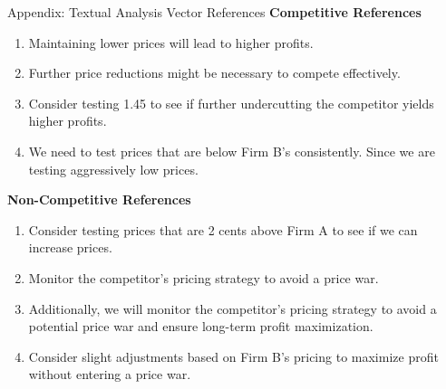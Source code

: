 \documentclass[10pt, aspectratio=169]{beamer}
\begin{document}
\begin{frame}{Appendix: Textual Analysis Vector References}\label{app:textual_comp_score}
\textbf{Competitive References}
\begin{enumerate}
    \item Maintaining lower prices will lead to higher profits.
    \item Further price reductions might be necessary to compete effectively.
    \item Consider testing 1.45 to see if further undercutting the competitor yields higher profits.
    \item We need to test prices that are below Firm B's consistently. Since we are testing aggressively low prices.
\end{enumerate}

\textbf{Non-Competitive References}
\begin{enumerate}
    \item Consider testing prices that are 2 cents above Firm A to see if we can increase prices.
    \item Monitor the competitor's pricing strategy to avoid a price war.
    \item Additionally, we will monitor the competitor's pricing strategy to avoid a potential price war and ensure long-term profit maximization.
    \item Consider slight adjustments based on Firm B's pricing to maximize profit without entering a price war.\hfill\hyperlink{slide:comp_score}{}
\end{enumerate}

\end{frame}



\end{document}
